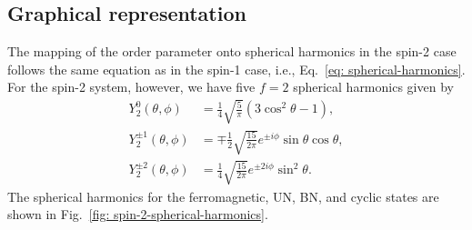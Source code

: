\subsection{Graphical representation}
The mapping of the order parameter onto spherical harmonics in the spin-2 case
follows the same equation as in the spin-1 case, i.e.,
Eq.~\eqref{eq: spherical-harmonics}.
For the spin-2 system, however, we have five \(f=2\) spherical harmonics given
by
\begin{align}
    Y_2^0(\theta, \phi)       & = \frac{1}{4}\sqrt{\frac{5}{\pi}}(3\cos^2\theta - 1), \\
    Y_2^{\pm 1}(\theta, \phi) & =
    \mp \frac{1}{2}\sqrt{\frac{15}{2\pi}}e^{\pm i\phi}\sin\theta\cos\theta,           \\
    Y_2^{\pm 2}(\theta, \phi) & =
    \frac{1}{4}\sqrt{\frac{15}{2\pi}}e^{\pm 2i\phi}\sin^2\theta.
\end{align}
The spherical harmonics for the ferromagnetic, UN, BN, and cyclic states
are shown in Fig.~\ref{fig: spin-2-spherical-harmonics}.
